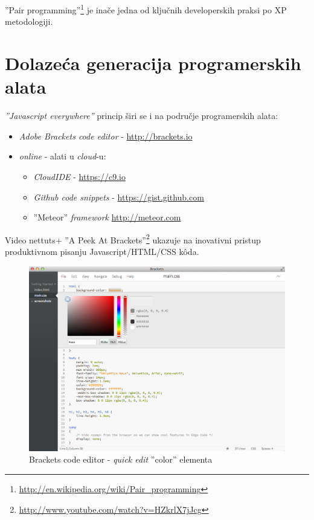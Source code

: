 \documentclass[times, utf8, seminar]{fit}
\begin{document}
''Pair programming''\footnote{\url{http://en.wikipedia.org/wiki/Pair_programming}} je inače  jedna od ključnih developerskih praksi po XP metodologiji\citep{agileart}.

\section{Dolazeća generacija programerskih alata}

\emph{''Javascript everywhere''} princip širi se i na područje programerskih alata:
\begin{itemize}
   \item \emph{Adobe Brackets code editor} - \url{http://brackets.io}
   \item \emph{online} - alati u \emph{cloud}-u:
   \begin{itemize}
     \item \emph{CloudIDE} - \url{https://c9.io}
     \item \emph{Github code snippets} - \url{https://gist.github.com}
     \item ''Meteor'' \emph{framework} \url{http://meteor.com}
   \end{itemize}
\end{itemize}

Video nettuts+ ''A Peek At Brackets''\footnote{\url{http://www.youtube.com/watch?v=HZkrlX7jJcg}} ukazuje na inovativni pristup produktivnom pisanju Javascript/HTML/CSS k\^oda.

\begin{figure}[H]
\centering
\includegraphics[width=12cm]{img/brackets_color_edit.png}
\caption{Brackets code editor - \emph{quick edit} ''color'' elementa}
\end{figure}
\end{document}
